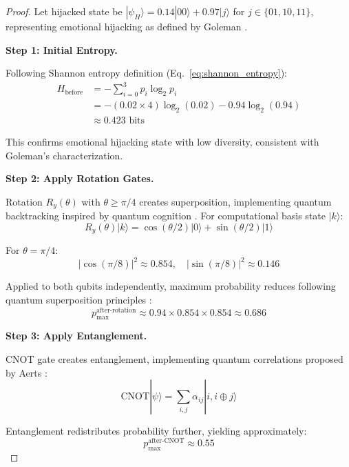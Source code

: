 \documentclass[11pt,letterpaper]{article}
\newcommand{\ket}[1]{|#1\rangle}
\begin{document}
\begin{proof}
Let hijacked state be $\ket{\psi_H} = 0.14\ket{00} + 0.97\ket{j}$ for $j \in \{01, 10, 11\}$, representing emotional hijacking as defined by Goleman \cite{goleman1995emotional}.

\textbf{Step 1: Initial Entropy.}

Following Shannon entropy definition (Eq.~\ref{eq:shannon_entropy}):
\begin{align}
H_{\text{before}} &= -\sum_{i=0}^{3}p_i\log_2 p_i \\
&= -(0.02 \times 4)\log_2(0.02) - 0.94\log_2(0.94) \\
&\approx 0.423 \text{ bits}
\end{align}

This confirms emotional hijacking state with low diversity, consistent with Goleman's \cite{goleman1995emotional} characterization.

\textbf{Step 2: Apply Rotation Gates.}

Rotation $R_y(\theta)$ with $\theta \geq \pi/4$ creates superposition, implementing quantum backtracking inspired by quantum cognition \cite{busemeyer2012quantum}. For computational basis state $\ket{k}$:
\begin{equation}
R_y(\theta)\ket{k} = \cos(\theta/2)\ket{0} + \sin(\theta/2)\ket{1}
\end{equation}

For $\theta = \pi/4$:
\begin{equation}
|\cos(\pi/8)|^2 \approx 0.854, \quad |\sin(\pi/8)|^2 \approx 0.146
\end{equation}

Applied to both qubits independently, maximum probability reduces following quantum superposition principles \cite{busemeyer2012quantum}:
\begin{equation}
p_{\max}^{\text{after-rotation}} \approx 0.94 \times 0.854 \times 0.854 \approx 0.686
\end{equation}

\textbf{Step 3: Apply Entanglement.}

CNOT gate creates entanglement, implementing quantum correlations proposed by Aerts \cite{aerts2009quantum}:
\begin{equation}
\text{CNOT}\ket{\psi} = \sum_{i,j} \alpha_{ij}\ket{i, i \oplus j}
\end{equation}

Entanglement redistributes probability further, yielding approximately:
\begin{equation}
p_{\max}^{\text{after-CNOT}} \approx 0.55
\end{equation}


\end{proof}
\end{document}
